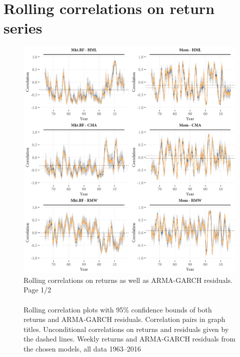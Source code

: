 \section{Rolling correlations on return series}
\label{app:rolling_return}
\begin{figure}[H]
  \centering
  \footnotesize
  \caption{Rolling correlations on returns as well as ARMA-GARCH residuals. Page 1/2  \\ \quad \\
  Rolling correlation plots with 95\% confidence bounds of both returns and ARMA-GARCH residuals. Correlation pairs in graph titles. Unconditional correlations on returns and residuals given by the dashed lines. Weekly returns and ARMA-GARCH residuals from the chosen models, all data 1963--2016}
  \label{fig:appendix_rolling1}
  \includegraphics[scale=1]{graphics/appendix_rolling1.png}  
\end{figure}
